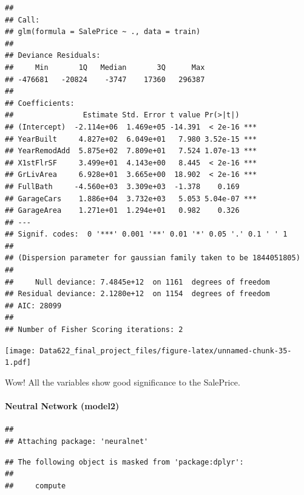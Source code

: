 \documentclass[
]{article}
\begin{document}
\begin{verbatim}
## 
## Call:
## glm(formula = SalePrice ~ ., data = train)
## 
## Deviance Residuals: 
##     Min       1Q   Median       3Q      Max  
## -476681   -20824    -3747    17360   296387  
## 
## Coefficients:
##                Estimate Std. Error t value Pr(>|t|)    
## (Intercept)  -2.114e+06  1.469e+05 -14.391  < 2e-16 ***
## YearBuilt     4.827e+02  6.049e+01   7.980 3.52e-15 ***
## YearRemodAdd  5.875e+02  7.809e+01   7.524 1.07e-13 ***
## X1stFlrSF     3.499e+01  4.143e+00   8.445  < 2e-16 ***
## GrLivArea     6.928e+01  3.665e+00  18.902  < 2e-16 ***
## FullBath     -4.560e+03  3.309e+03  -1.378    0.169    
## GarageCars    1.886e+04  3.732e+03   5.053 5.04e-07 ***
## GarageArea    1.271e+01  1.294e+01   0.982    0.326    
## ---
## Signif. codes:  0 '***' 0.001 '**' 0.01 '*' 0.05 '.' 0.1 ' ' 1
## 
## (Dispersion parameter for gaussian family taken to be 1844051805)
## 
##     Null deviance: 7.4845e+12  on 1161  degrees of freedom
## Residual deviance: 2.1280e+12  on 1154  degrees of freedom
## AIC: 28099
## 
## Number of Fisher Scoring iterations: 2
\end{verbatim}

\texttt{[image: Data622\_final\_project\_files/figure-latex/unnamed-chunk-35-1.pdf]}

Wow! All the variables show good significance to the SalePrice.

\hypertarget{neutral-network-model2}{%
\paragraph{Neutral Network (model2)}\label{neutral-network-model2}}

\begin{verbatim}
## 
## Attaching package: 'neuralnet'
\end{verbatim}

\begin{verbatim}
## The following object is masked from 'package:dplyr':
## 
##     compute
\end{verbatim}
\end{document}
